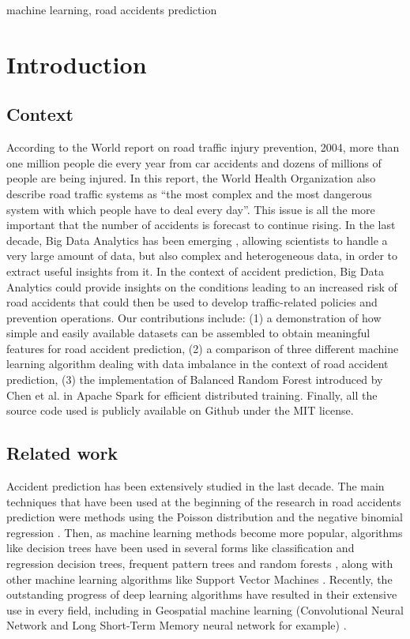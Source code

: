\documentclass[conference]{IEEEtran}
\begin{document}
\begin{IEEEkeywords}
machine learning, road accidents prediction
\end{IEEEkeywords}

\section{Introduction}
\subsection{Context}
According to the World report on road traffic injury prevention, 2004, more than one million people die every year from car accidents and dozens of millions of people are being injured\cite{Peden2004}. In this report, the World Health Organization also describe road traffic systems as “the most complex and the most dangerous system with which people have to deal every day”. This issue is all the more important that the number of accidents is forecast to continue rising. In the last decade, Big Data Analytics has been emerging \cite{Gandomi2015}, allowing scientists to handle a very large amount of data, but also complex and heterogeneous data, in order to extract useful insights from it. In the context of accident prediction, Big Data Analytics could provide insights on the conditions leading to an increased risk of road accidents that could then be used to develop traffic-related policies and prevention operations. Our contributions include: (1) a demonstration of how simple and easily available datasets can be assembled to obtain meaningful features for road accident prediction, (2) a comparison of three different machine learning algorithm dealing with data imbalance in the context of road accident prediction, (3) the implementation of Balanced Random Forest introduced by Chen et al. in Apache Spark for efficient distributed training. Finally, all the source code used is publicly available on Github under the MIT license.

\subsection{Related work}
Accident prediction has been extensively studied in the last decade. The main techniques that have been used at the beginning of the research in road accidents prediction were methods using the Poisson distribution and the negative binomial regression \cite{Chang2005}. Then, as machine learning methods become more popular, algorithms like decision trees have been used in several forms like classification and regression decision trees, frequent pattern trees and random forests
\cite{Chang2005, Theofilatos2017, Abellan2013, Lin2015}, along with other machine learning algorithms like Support Vector Machines \cite{LI20081611}. Recently, the outstanding progress of deep learning algorithms have resulted in their extensive use in every field, including in Geospatial machine learning (Convolutional Neural Network and Long Short-Term Memory neural network for example) \cite{Yuan2018, QChen2016}.
\end{document}
